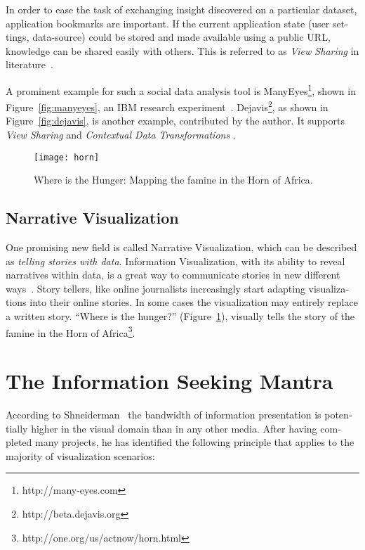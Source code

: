 \begin{english}
In order to ease the task of exchanging insight discovered on a particular dataset, application bookmarks are important. If the current application state (user settings, data-source) could be stored and made available using a public URL, knowledge can be shared easily with others. This is referred to as \emph{View Sharing} in literature~\cite{clark91}.

A prominent example for such a social data analysis tool is ManyEyes\footnote{http://many-eyes.com}, shown in Figure~\ref{fig:manyeyes}, an IBM research experiment~\cite{manyeyes}. Dejavis\footnote{http://beta.dejavis.org}, as shown in Figure~\ref{fig:dejavis}, is another example, contributed by the author. It supports \emph{View Sharing} \cite{clark91} and \emph{Contextual Data Transformations} \cite{manyeyes}.


\begin{figure}
\centering
\texttt{[image: horn]}
\caption{Where is the Hunger: Mapping the famine in the Horn of Africa.}
\label{fig:horn}
\end{figure}

\subsection{Narrative Visualization}


One promising new field is called Narrative Visualization, which can be described as \emph{telling stories with data}. Information Visualization, with its ability to reveal narratives within data, is a great way to communicate stories in new different ways~\cite{NarrativeVis10,Gershon:2001}. Story tellers, like online journalists increasingly start adapting visualizations into their online stories. In some cases the visualization may entirely replace a written story. ``Where is the hunger?'' (Figure~\ref{fig:horn}), visually tells the story of the famine in the Horn of Africa\footnote{http://one.org/us/actnow/horn.html}.


\section{The Information Seeking Mantra}

According to Shneiderman~\cite{shneiderman96eyes} the bandwidth of information presentation is potentially higher in the visual domain than in any other media. After having completed many projects, he has identified the following principle that applies to the majority of visualization scenarios:


\end{english}
